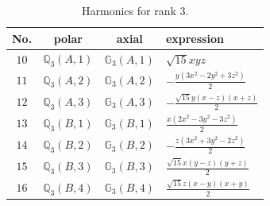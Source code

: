 \documentclass[fleqn,8pt,landscape]{jsarticle}
\begin{document}
\begin{table}[ht!]
\begin{center}
\caption{Harmonics for rank 3.}
\renewcommand{\arraystretch}{1.3}
\begin{tabular}{cccl} \hline \hline
No. & polar & axial & expression \\ \hline
$ 10 $ & $ \mathbb{Q}_{3}(A,1) $ & $ \mathbb{G}_{3}(A,1) $ & $ \sqrt{15} x y z $ \\
$ 11 $ & $ \mathbb{Q}_{3}(A,2) $ & $ \mathbb{G}_{3}(A,2) $ & $ - \frac{y \left(3 x^{2} - 2 y^{2} + 3 z^{2}\right)}{2} $ \\
$ 12 $ & $ \mathbb{Q}_{3}(A,3) $ & $ \mathbb{G}_{3}(A,3) $ & $ - \frac{\sqrt{15} y \left(x - z\right) \left(x + z\right)}{2} $ \\
$ 13 $ & $ \mathbb{Q}_{3}(B,1) $ & $ \mathbb{G}_{3}(B,1) $ & $ \frac{x \left(2 x^{2} - 3 y^{2} - 3 z^{2}\right)}{2} $ \\
$ 14 $ & $ \mathbb{Q}_{3}(B,2) $ & $ \mathbb{G}_{3}(B,2) $ & $ - \frac{z \left(3 x^{2} + 3 y^{2} - 2 z^{2}\right)}{2} $ \\
$ 15 $ & $ \mathbb{Q}_{3}(B,3) $ & $ \mathbb{G}_{3}(B,3) $ & $ \frac{\sqrt{15} x \left(y - z\right) \left(y + z\right)}{2} $ \\
$ 16 $ & $ \mathbb{Q}_{3}(B,4) $ & $ \mathbb{G}_{3}(B,4) $ & $ \frac{\sqrt{15} z \left(x - y\right) \left(x + y\right)}{2} $ \\
 \hline \hline
\end{tabular}
\end{center}
\end{table}
\end{document}
